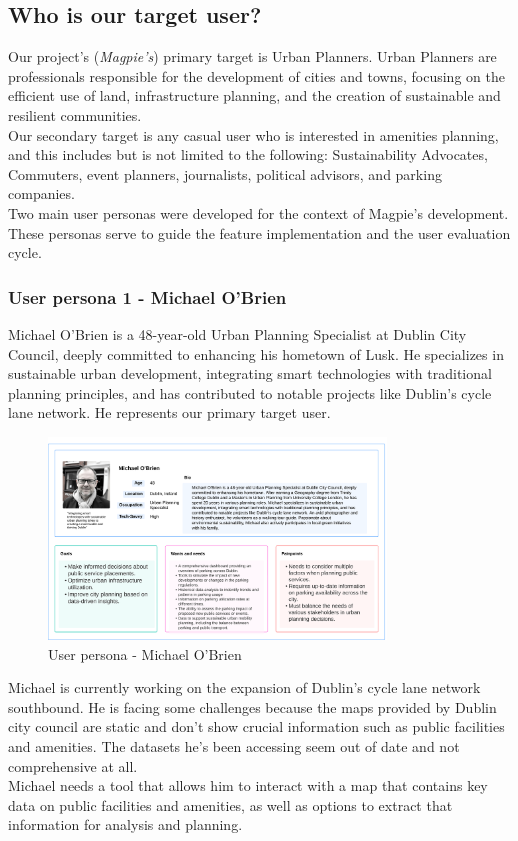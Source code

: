 \subsection{Who is our target user?}
Our project's (\textit{Magpie's}) primary target is Urban Planners. Urban
Planners are professionals responsible for the development of cities and towns,
focusing on the efficient use of land, infrastructure planning, and the creation
of sustainable and resilient communities. \\
Our secondary target is any casual user who is interested in amenities planning, and this includes but is not limited to the following: Sustainability Advocates, Commuters, event planners, journalists, political advisors, and parking companies.\\

Two main user personas were developed for the context of Magpie's development. \\
These personas serve to guide the feature implementation and the user evaluation cycle.\\

\subsubsection{User persona 1 - Michael O'Brien}
\noindent Michael O'Brien is a 48-year-old Urban Planning Specialist at Dublin City Council, deeply committed to enhancing his hometown of Lusk. He specializes in sustainable urban development, integrating smart technologies with traditional planning principles, and has contributed to notable projects like Dublin's cycle lane network. He represents our primary target user. \\
\newpage
\begin{figure}[h!]
    \centering
    \includegraphics[width=0.8\textwidth]{images/michael-obrien-userpersona.png}
    \caption{User persona - Michael O'Brien}
\end{figure}
Michael is currently working on the expansion of Dublin's cycle lane network southbound. He is facing some challenges because the maps provided by Dublin city council are static and don't show crucial information such as public facilities and amenities. The datasets he's been accessing seem out of date and not comprehensive at all.\\
Michael needs a tool that allows him to interact with a map that contains key data on public facilities and amenities, as well as options to extract that information for analysis and planning.

